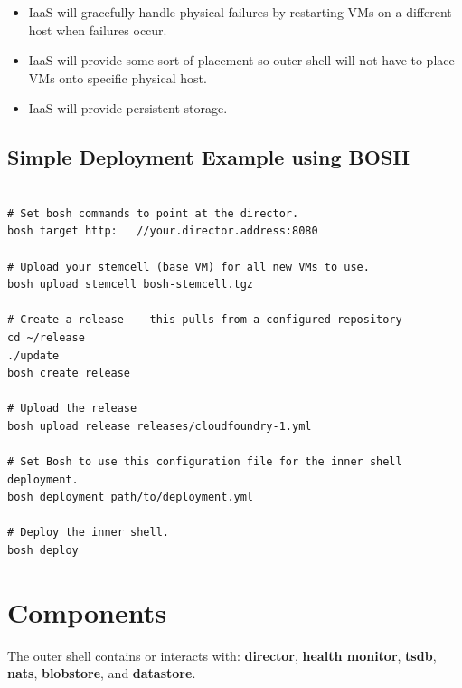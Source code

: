 \begin{itemize}
\item IaaS will gracefully handle physical failures by restarting VMs on a different host when failures occur.

\item IaaS will provide some sort of placement so outer shell will not have to place VMs onto specific physical host.

\item IaaS will provide persistent storage.

\end{itemize}

\section{Simple Deployment Example using BOSH}
\label{simpledeploymentexampleusingbosh}

\begin{adjustwidth}{2.5em}{2.5em}
\begin{verbatim}

# Set bosh commands to point at the director.
bosh target http:   //your.director.address:8080

# Upload your stemcell (base VM) for all new VMs to use.
bosh upload stemcell bosh-stemcell.tgz

# Create a release -- this pulls from a configured repository
cd ~/release
./update
bosh create release

# Upload the release
bosh upload release releases/cloudfoundry-1.yml

# Set Bosh to use this configuration file for the inner shell deployment.
bosh deployment path/to/deployment.yml

# Deploy the inner shell.
bosh deploy

\end{verbatim}
\end{adjustwidth}

\chapter{Components}
\label{components}

The outer shell contains or interacts with: \textbf{director}, \textbf{health monitor}, \textbf{tsdb}, \textbf{nats}, \textbf{blobstore}, and \textbf{datastore}.

